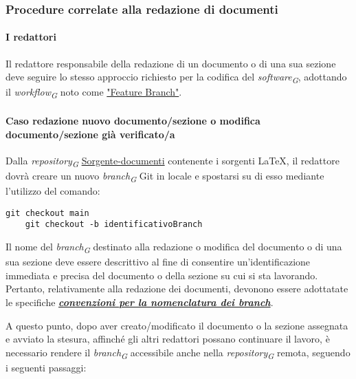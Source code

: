 \subsubsection{Procedure correlate alla redazione di documenti}

\paragraph{I redattori}
Il redattore responsabile della redazione di un documento o di una sua sezione deve seguire lo stesso approccio richiesto per la codifica del \textit{software}\textsubscript{\textit{G}}, adottando il \textit{workflow}\textsubscript{\textit{G}} noto come \href{https://www.atlassian.com/git/tutorials/comparing-workflows/feature-branch-workflow}{"Feature Branch"}.

\paragraph*{\textbf{Caso redazione nuovo documento/sezione o modifica documento/sezione già verificato/a}}
Dalla \textit{repository}\textsubscript{\textit{G}} \href{https://github.com/ByteOps-swe/Sorgente-documenti}{Sorgente-documenti} contenente i sorgenti \LaTeX, il redattore dovrà creare un nuovo \textit{branch}\textsubscript{\textit{G}} Git in locale e spostarsi su di esso mediante l'utilizzo del comando:

\vspace{0.1cm}

\begin{lstlisting}[style=code]
    git checkout main
    git checkout -b identificativoBranch
\end{lstlisting}

Il nome del \textit{branch}\textsubscript{\textit{G}} destinato alla redazione o modifica del documento o di una sua sezione deve essere descrittivo al fine di consentire un'identificazione immediata e precisa del documento o della sezione su cui si sta lavorando. Pertanto, relativamente alla redazione dei documenti, devonono essere adottatate le specifiche \hyperlink{par:convezioninomenclaturabranchdocumenti}{\textit{\textbf{convenzioni per la nomenclatura dei branch}}}.

A questo punto, dopo aver creato/modificato il documento o la sezione assegnata e avviato la stesura, affinché gli altri redattori possano continuare il lavoro, è necessario rendere il \textit{branch}\textsubscript{\textit{G}} accessibile anche nella \textit{repository}\textsubscript{\textit{G}} remota, seguendo i seguenti passaggi:

